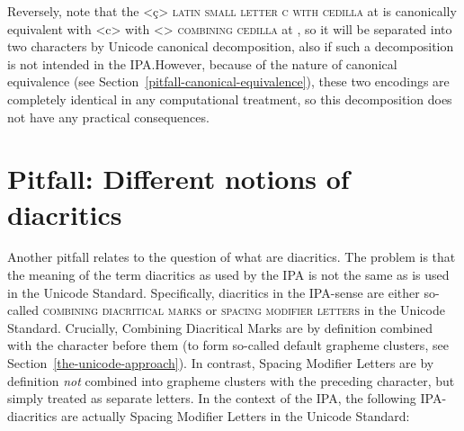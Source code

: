Reversely, note that the <ç> \textsc{latin small letter c with cedilla} at
 is canonically equivalent with <c> with <>
\textsc{combining cedilla} at , so it will be separated into two
characters by Unicode canonical decomposition, also if such a decomposition is
not intended in the IPA.\@ However, because of the nature of canonical
equivalence (see Section~\ref{pitfall-canonical-equivalence}), these two
encodings are completely identical in any computational treatment, so this
decomposition does not have any practical consequences.

\section{Pitfall: Different notions of diacritics}
\label{pitfall-different-notions-of-diacritics}


Another pitfall relates to the question of what are diacritics. The problem is that
the meaning of the term diacritics as used by the IPA is not the same as is used
in the Unicode Standard. Specifically, diacritics in the IPA-sense are either
so-called \textsc{combining diacritical marks} or \textsc{spacing modifier
letters} in the Unicode Standard. Crucially, Combining Diacritical Marks are by
definition combined with the character before them (to form so-called default
grapheme clusters, see Section~\ref{the-unicode-approach}). In contrast, Spacing
Modifier Letters are by definition \emph{not} combined into grapheme clusters
with the preceding character, but simply treated as separate letters. In the
context of the IPA, the following IPA-diacritics are actually Spacing Modifier
Letters in the Unicode Standard:

